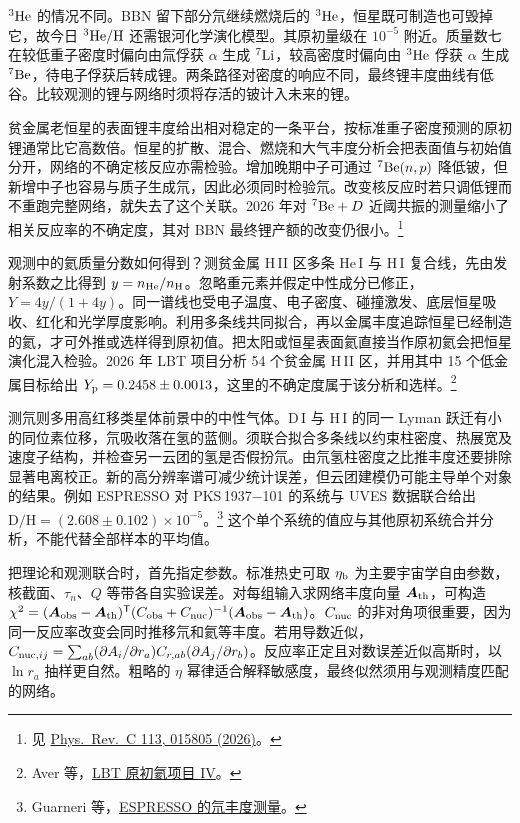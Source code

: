 $^3{\rm He}$ 的情况不同。BBN 留下部分氘继续燃烧后的 $^3{\rm He}$，恒星既可制造也可毁掉它，故今日 $^3{\rm He}/{\rm H}$ 还需银河化学演化模型。其原初量级在 $10^{-5}$ 附近。质量数七在较低重子密度时偏向由氚俘获 $\alpha$ 生成 $^7{\rm Li}$，较高密度时偏向由 $^3{\rm He}$ 俘获 $\alpha$ 生成 $^7{\rm Be}$，待电子俘获后转成锂。两条路径对密度的响应不同，最终锂丰度曲线有低谷。比较观测的锂与网络时须将存活的铍计入未来的锂。

贫金属老恒星的表面锂丰度给出相对稳定的一条平台，按标准重子密度预测的原初锂通常比它高数倍。恒星的扩散、混合、燃烧和大气丰度分析会把表面值与初始值分开，网络的不确定核反应亦需检验。增加晚期中子可通过 $^7{\rm Be}(n,p)$ 降低铍，但新增中子也容易与质子生成氘，因此必须同时检验氘。改变核反应时若只调低锂而不重跑完整网络，就失去了这个关联。2026 年对 $^7{\rm Be}+D$ 近阈共振的测量缩小了相关反应率的不确定度，其对 BBN 最终锂产额的改变仍很小。\footnote{见 \href{https://doi.org/10.1103/37y9-m3yb}{Phys.\ Rev.\ C 113, 015805 (2026)}。}

观测中的氦质量分数如何得到？测贫金属 H\,II 区多条 He\,I 与 H\,I 复合线，先由发射系数之比得到 $y=n_{\rm He}/n_{\rm H}$。忽略重元素并假定中性成分已修正，$Y=4y/(1+4y)$。同一谱线也受电子温度、电子密度、碰撞激发、底层恒星吸收、红化和光学厚度影响。利用多条线共同拟合，再以金属丰度追踪恒星已经制造的氦，才可外推或选样得到原初值。把太阳或恒星表面氦直接当作原初氦会把恒星演化混入检验。2026 年 LBT 项目分析 54 个贫金属 H\,II 区，并用其中 15 个低金属目标给出 $Y_{\rm p}=0.2458\pm0.0013$，这里的不确定度属于该分析和选样。\footnote{Aver 等，\href{https://arxiv.org/abs/2601.22238}{LBT 原初氦项目 IV}。}

测氘则多用高红移类星体前景中的中性气体。D\,I 与 H\,I 的同一 Lyman 跃迁有小的同位素位移，氘吸收落在氢的蓝侧。须联合拟合多条线以约束柱密度、热展宽及速度子结构，并检查另一云团的氢是否假扮氘。由氘氢柱密度之比推丰度还要排除显著电离校正。新的高分辨率谱可减少统计误差，但云团建模仍可能主导单个对象的结果。例如 ESPRESSO 对 PKS\,1937$-$101 的系统与 UVES 数据联合给出 $\mathrm{D/H}=(2.608\pm0.102)\times10^{-5}$。\footnote{Guarneri 等，\href{https://arxiv.org/abs/2402.05586}{ESPRESSO 的氘丰度测量}。} 这个单个系统的值应与其他原初系统合并分析，不能代替全部样本的平均值。

把理论和观测联合时，首先指定参数。标准热史可取 $\eta_{\rm b}$ 为主要宇宙学自由参数，核截面、$\tau_n$、$Q$ 等带各自实验误差。对每组输入求网络丰度向量 $\bm A_{\rm th}$，可构造 $\chi^2=(\bm A_{\rm obs}-\bm A_{\rm th})^{\mathsf T}(C_{\rm obs}+C_{\rm nuc})^{-1}(\bm A_{\rm obs}-\bm A_{\rm th})$。$C_{\rm nuc}$ 的非对角项很重要，因为同一反应率改变会同时推移氘和氦等丰度。若用导数近似，$C_{{\rm nuc},ij}=\sum_{ab}(\partial A_i/\partial r_a)C_{r,ab}(\partial A_j/\partial r_b)$。反应率正定且对数误差近似高斯时，以 $\ln r_a$ 抽样更自然。粗略的 $\eta$ 幂律适合解释敏感度，最终似然须用与观测精度匹配的网络。

